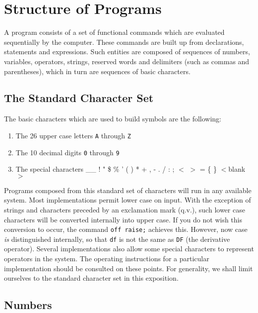 \chapter{Structure of Programs}

A {\REDUCE} program consists of a set of
functional commands which are evaluated sequentially by the computer.
These commands are built up from declarations, statements and expressions.
Such entities are composed of sequences of numbers, variables, operators,
strings, reserved words and delimiters (such as commas and parentheses),
which in turn are sequences of basic characters.

\section{The {\REDUCE} Standard Character Set}

The basic characters which are used to build
{\REDUCE} symbols are the following:
\begin{enumerate}
\item The 26 upper case letters {\tt A} through {\tt Z}
\item The 10 decimal digits {\tt 0} through {\tt 9}
\item The special characters \_\_ ! " \$ \% ' ( ) * + , - . / : ; $<$ $>$
      = \{ \} $<$blank$>$
\end{enumerate}
Programs composed from this standard set of characters will run in any
available {\REDUCE} system.  Most implementations permit lower case on
input.  With the exception of strings and characters preceded by an
exclamation mark (q.v.), such lower case
characters will be converted internally into upper case.  If you do not
wish this conversion to occur, the command {\tt off raise;} 
achieves this.  However, now case {\em is} distinguished internally, so
that {\tt df} is not the same as {\tt DF} (the derivative operator).
Several implementations also allow some special characters to represent
operators in the system.  The operating instructions for a particular
implementation should be consulted on these points.  For generality, we
shall limit ourselves to the standard character set in this exposition.

\section{Numbers}

